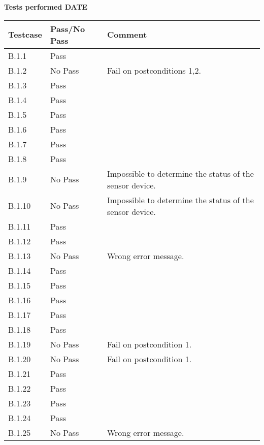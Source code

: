 \renewcommand{\testdate}{DATE}
\textbf{ Tests performed \testdate}
\begin{center}
  		\begin{tabular}{| p{3cm} | p{5cm} | p{5cm} |}
    		\hline
	    	\textbf{Testcase}			& \textbf{Pass/No Pass} 	& \textbf{Comment} \\ \hline
    		B.1.1		 						& Pass 										&  				\\ \hline
    		B.1.2		 						& No Pass 										& Fail on postconditions 1,2. 				 \\	\hline
    		B.1.3		 						& Pass 										& 				 \\	\hline
    		B.1.4		 						& Pass 										& 				 \\	\hline
    		B.1.5		 						& Pass 										& 				 \\	\hline
    		B.1.6		 						& Pass 										& 				 \\	\hline
    		B.1.7		 						& Pass 										& 				 \\	\hline
    		B.1.8		 						& Pass 										& 				 \\	\hline
    		B.1.9		 						& No Pass 										& Impossible to determine the status of the sensor device. 				 \\	\hline
    		B.1.10	 							& No Pass 										& Impossible to determine the status of the sensor device.				 \\	\hline
    		B.1.11	 							& Pass 										& 				 \\	\hline
    		B.1.12	 							& Pass 										& 				 \\	\hline
    		B.1.13	 							& No Pass 										& Wrong error message.				 \\	\hline
    		B.1.14	 							& Pass 										& 				 \\	\hline
    		B.1.15	 							& Pass 										& 				 \\	\hline
    		B.1.16	 							& Pass 										& 				 \\	\hline
    		B.1.17	 							& Pass 										& 				 \\	\hline
    		B.1.18	 							& Pass 										& 				 \\	\hline
    		B.1.19	 							& No Pass 										& Fail on postcondition 1. 				 \\	\hline
    		B.1.20	 							& No Pass 										& Fail on postcondition 1.				 \\	\hline
    		B.1.21	 							& Pass 										& 				 \\	\hline
    		B.1.22	 							& Pass 										& 				 \\	\hline
    		B.1.23	 							& Pass 										& 				 \\	\hline
    		B.1.24	 							& Pass 										& 				 \\	\hline
    		B.1.25	 							& No Pass 										& Wrong error message.				 \\	\hline
 		 \end{tabular}
	\end{center}